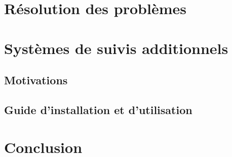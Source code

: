 \documentclass[french]{article}
\begin{document}
    \section{Résolution des problèmes}

    \section{Systèmes de suivis additionnels}
    \subsection{Motivations}
    \subsection{Guide d'installation et d'utilisation}

    \section{Conclusion}
\end{document}
